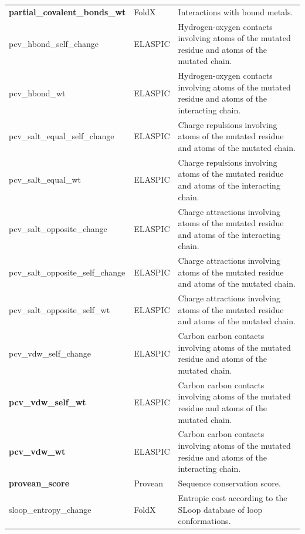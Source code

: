 \begin{table}[tb]
\begin{tabular}{ l | l | p{8cm} }
		\textbf{partial\_covalent\_bonds\_wt} & FoldX          & Interactions with bound metals.                                                                     \\
		pcv\_hbond\_self\_change              & ELASPIC        & Hydrogen-oxygen contacts involving atoms of the mutated residue and atoms of the mutated chain.     \\
		pcv\_hbond\_wt                        & ELASPIC        & Hydrogen-oxygen contacts involving atoms of the mutated residue and atoms of the interacting chain. \\
		pcv\_salt\_equal\_self\_change        & ELASPIC        & Charge repulsions involving atoms of the mutated residue and atoms of the mutated chain.            \\
		pcv\_salt\_equal\_wt                  & ELASPIC        & Charge repulsions involving atoms of the mutated residue and atoms of the interacting chain.        \\
		pcv\_salt\_opposite\_change           & ELASPIC        & Charge attractions involving atoms of the mutated residue and atoms of the interacting chain.       \\
		pcv\_salt\_opposite\_self\_change     & ELASPIC        & Charge attractions involving atoms of the mutated residue and atoms of the mutated chain.           \\
		pcv\_salt\_opposite\_self\_wt         & ELASPIC        & Charge attractions involving atoms of the mutated residue and atoms of the mutated chain.           \\
		pcv\_vdw\_self\_change                & ELASPIC        & Carbon carbon contacts involving atoms of the mutated residue and atoms of the mutated chain.       \\
		\textbf{pcv\_vdw\_self\_wt}           & ELASPIC        & Carbon carbon contacts involving atoms of the mutated residue and atoms of the mutated chain.       \\
		\textbf{pcv\_vdw\_wt}                 & ELASPIC        & Carbon carbon contacts involving atoms of the mutated residue and atoms of the interacting chain.   \\
		\textbf{provean\_score}               & Provean        & Sequence conservation score.                                                                        \\
		sloop\_entropy\_change                & FoldX          & Entropic cost according to the SLoop database of loop conformations.                                \\

\end{tabular}
\end{table}
